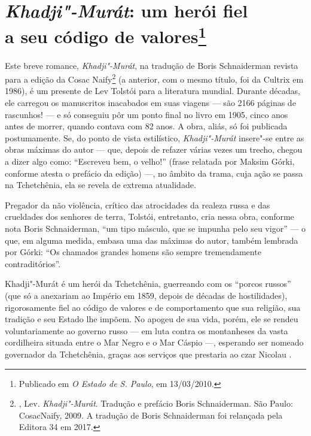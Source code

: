 \chapter{\emph{Khadji"-Murát}: um herói fiel\\
a seu código de valores\footnote{Publicado em \emph{O Estado de S. Paulo}, em
  13/03/2010.}}
  \label{khadji}

Este breve romance, \emph{Khadji"-Murát}, na tradução de Boris
Schnaiderman revista para a edição da Cosac Naify\footnote{,
  Lev. \emph{Khadji"-Murát}. Tradução e prefácio Boris Schnaiderman. São
  Paulo: CosacNaify, 2009. A tradução de Boris Schnaiderman foi
  relançada pela Editora 34 em 2017.} (a anterior, com o mesmo título,
foi da Cultrix em 1986), é um presente de Lev Tolstói para a literatura
mundial. Durante décadas, ele carregou os manuscritos inacabados em suas
viagens --- são 2166 páginas de rascunhos! --- e só conseguiu pôr um
ponto final no livro em 1905, cinco anos antes de morrer, quando contava
com 82 anos. A obra, aliás, só foi publicada postumamente. Se, do ponto
de vista estilístico, \emph{Khadji"-Murát} insere"-se entre as
obras máximas do autor --- que, depois de refazer várias vezes um trecho,
chegou a dizer algo como: ``Escreveu bem, o velho!'' (frase relatada por
Maksim Górki, conforme atesta o prefácio da edição) ---, no âmbito da
trama, cuja ação se passa na Tchetchênia, ela se revela de extrema
atualidade.

Pregador da não violência, crítico das atrocidades da realeza russa e
das crueldades dos senhores de terra, Tolstói, entretanto, cria nessa
obra, conforme nota Boris Schnaiderman, ``um tipo másculo, que se impunha
pelo seu vigor'' --- o que, em alguma medida, embasa uma das máximas do
autor, também lembrada por Górki: ``Os chamados grandes homens são sempre
tremendamente contraditórios''.

Khadji"-Murát é um herói da Tchetchênia, guerreando com os ``porcos
russos'' (que só a anexariam ao Império em 1859, depois de décadas de
hostilidades), rigorosamente fiel ao código de valores e de
comportamento que sua religião, sua tradição e seu Estado lhe impõem. No
apogeu de sua vida, porém, ele se rendeu voluntariamente ao governo
russo --- em luta contra os montanheses da vasta cordilheira situada
entre o Mar Negro e o Mar Cáspio ---, esperando ser nomeado governador da
Tchetchênia, graças aos serviços que prestaria ao czar Nicolau .

